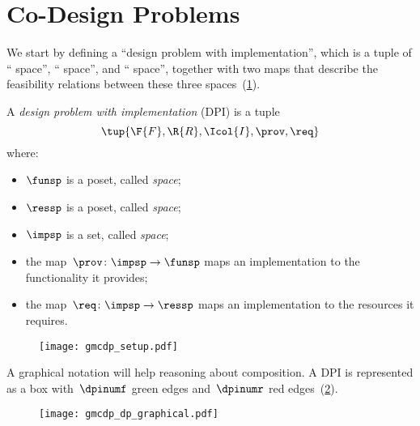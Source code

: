 
\section{Co-Design Problems}
\label{sec:Design-Problems}

We start by defining
a ``design problem with implementation'', which is a tuple of ``
space'', `` space'', and ``
space'', together with two maps that describe the feasibility relations
between these three spaces~(\cref{fig:setup}).
\begin{definition}
  \label{def:DPI}A \emph{design problem with implementation}
  (DPI) is a tuple
  \begin{equation}
    \tup{\F{F},\R{R},\Icol{I},\prov,\req}
  \end{equation}
  where:

  \begin{itemize}
    \item $\funsp$ is a poset, called \emph{ space};
    \item $\ressp$ is a poset, called \emph{ space};
    \item $\impsp$ is a set, called \emph{ space};
    \item the map~$\prov\colon\impsp\rightarrow\funsp$
    maps an implementation to the functionality it provides;
    \item the map~$\req\colon\impsp\rightarrow\ressp$
    maps an implementation to the resources it requires.
  \end{itemize}

  \begin{figure}[h]
    \begin{center}
      \texttt{[image: gmcdp\_setup.pdf]}
    \end{center}
    \caption{\label{fig:setup}}
  \end{figure}
\end{definition}


A graphical notation will help reasoning about composition. A DPI is represented as a box with~$\dpinumf$ green edges and~$\dpinumr$ red edges~(\cref{fig:dp_graphical}).

\begin{figure}[h]
  \centering
  \texttt{[image: gmcdp\_dp\_graphical.pdf]}
  \caption{\label{fig:dp_graphical}}
\end{figure}

